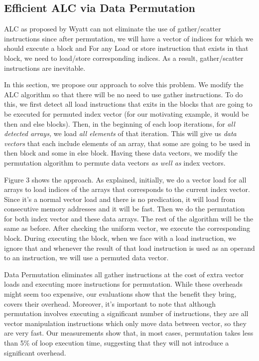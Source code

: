 \subsection{Efficient ALC via Data Permutation}
\label{sec:alc-data-permutation}

ALC as proposed by Wyatt \etal can not eliminate the use of gather/scatter instructions since after permutation, we will have a vector of indices for which we should execute a block and For any Load or store instruction that exists in that block, we need to load/store corresponding indices. As a result, gather/scatter instructions are inevitable.

In this section, we propose our approach to solve this problem. We modify the ALC algorithm so that there will be no need to use gather instructions. To do this, we first detect all load instructions that exits in the blocks that are going to be executed for permuted index vector (for our motivating example, it would be then and else blocks). Then, in the beginning of each loop iterations, for \emph{all detected arrays,} we load \emph{all elements} of that iteration. This will give us \emph{data vectors} that each include elements of an array, that some are going to be used in then block and some in else block. Having these data vectors, we modify the permutation algorithm to permute data vectors \emph{as well as} index vectors.

Figure 3 shows the approach. As explained, initially, we do a vector load for all arrays to load indices of the arrays that corresponds to the current index vector. Since it's a normal vector load and there is no predication, it will load from consecutive memory addresses and it will be fast. Then we do the permutation for both index vector and these data arrays. The rest of the algorithm will be the same as before. After checking the uniform vector, we execute the corresponding block. During executing the block, when we face with a load instruction, we ignore that and whenever the result of that load instruction is used as an operand to an instruction, we will use a permuted data vector.

Data Permutation eliminates all gather instructions at the cost of extra vector loads and executing more instructions for permutation. While these overheads might seem too expensive, our evaluations show that the benefit they bring, covers their overhead. Moreover, it's important to note that although permutation involves executing a significant number of instructions, they are all vector manipulation instructions which only move data between vector, so they are very fast. Our measurements show that, in most cases, permutation takes less than 5\% of loop execution time, suggesting that they will not introduce a significant overhead.  

